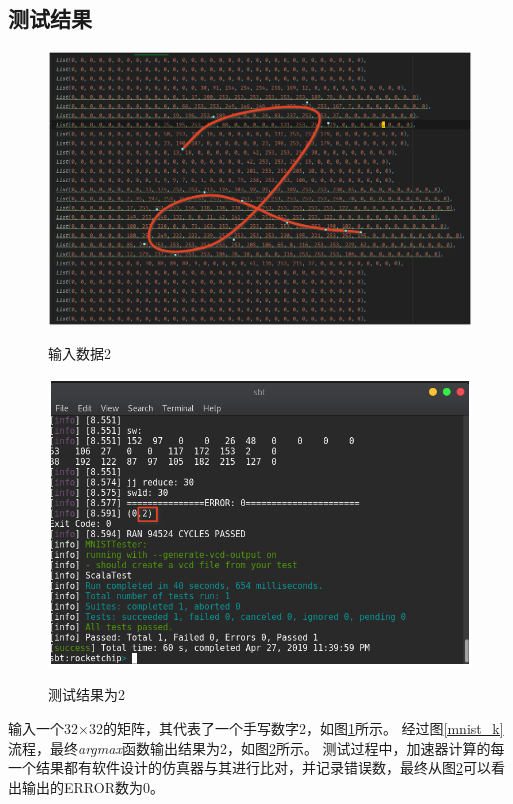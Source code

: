     \subsection{测试结果}
\begin{figure}[h]
    \centering
    \includegraphics[scale=0.3]{../pdf/2.png}\\
    \caption{输入数据2}
    \label{2}
\end{figure}
\begin{figure}[h]
    \centering
    \includegraphics[scale=0.6]{../pdf/2_result.png}\\
    \caption{测试结果为2}
    \label{2_result}
\end{figure}
    输入一个32×32的矩阵，其代表了一个手写数字2，如图\ref{2}所示。
    经过图\ref{mnist_k}流程，最终\emph{argmax}函数输出结果为2，如图\ref{2_result}所示。
    测试过程中，加速器计算的每一个结果都有软件设计的仿真器与其进行比对，并记录错误数，最终从图\ref{2_result}可以看出输出的ERROR数为0。

